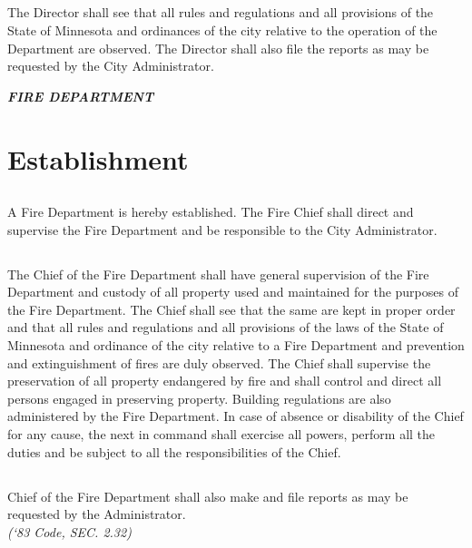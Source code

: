 \subsection{}
The Director shall see that all rules and regulations and all provisions of the State of Minnesota and ordinances of the city relative to the operation of the Department are observed.  The Director shall also file the reports as may be requested by the City Administrator.\\

\centerline{\textbf{\emph{\LARGE{FIRE DEPARTMENT}}}}
\setcounter{section}{39}
\section{Establishment}
\subsection{}
A Fire Department is hereby established.  The Fire Chief shall direct and supervise the Fire Department and be responsible to the City Administrator.
\subsection{}
The Chief of the Fire Department shall have general supervision of the Fire Department and custody of all property used and maintained for the purposes of the Fire Department.  The Chief shall see that the same are kept in proper order and that all rules and regulations and all provisions of the laws of the State of Minnesota and ordinance of the city relative to a Fire Department and prevention and extinguishment of fires are duly observed.  The Chief shall supervise the preservation of all property endangered by fire and shall control and direct all persons engaged in preserving property.  Building regulations are also administered by the Fire Department. In case of absence or disability of the Chief for any cause, the next in command shall exercise all powers, perform all the duties and be subject to all the responsibilities of the Chief.
\subsection{}
Chief of the Fire Department shall also make and file reports as may be requested by the Administrator.\\
\emph{(‘83 Code, SEC. 2.32)}
